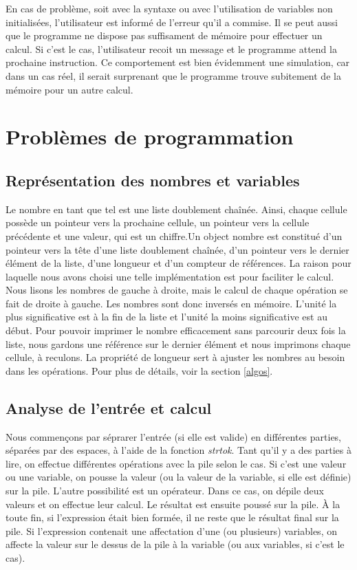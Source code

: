 \documentclass[letterpaper,12pt]{scrartcl}
\begin{document}
		En cas de problème, soit avec la syntaxe ou avec l'utilisation de variables non initialisées, l'utilisateur est informé de l'erreur qu'il a commise. Il se peut aussi que le programme ne dispose pas suffisament de mémoire pour effectuer un calcul. Si c'est le cas, l'utilisateur recoit un message et le programme attend la prochaine instruction. Ce comportement est bien évidemment une simulation, car dans un cas réel, il serait surprenant que le programme trouve subitement de la mémoire pour un autre calcul. 
			
	
    
	\section{Problèmes de programmation}
		\subsection{Représentation des nombres et variables}
		Le nombre en tant que tel est une liste doublement chaînée. Ainsi, chaque cellule possède un pointeur vers la prochaine cellule, un pointeur vers la cellule précédente et une valeur, qui est un chiffre.Un object nombre est constitué d'un pointeur vers la tête d'une liste doublement chaînée, d'un pointeur vers le dernier élément de la liste, d'une longueur et d'un compteur de références. La raison pour laquelle nous avons choisi une telle implémentation est pour faciliter le calcul. Nous lisons les nombres de gauche à droite, mais le calcul de chaque opération se fait de droite à gauche. Les nombres sont donc inversés en mémoire. L'unité la plus significative est à la fin de la liste et l'unité la moins significative est au début. Pour pouvoir imprimer le nombre efficacement sans parcourir deux fois la liste, nous gardons une référence sur le dernier élément et nous imprimons chaque cellule, à reculons. La propriété de longueur sert à ajuster les nombres au besoin dans les opérations. Pour plus de détails, voir la section \ref{algos}.

        
        \subsection{Analyse de l'entrée et calcul}
        Nous commençons par séprarer l'entrée (si elle est valide) en différentes parties, séparées par des espaces, à l'aide de la fonction \textit{strtok}. Tant qu'il y a des parties à lire, on effectue différentes opérations avec la pile selon le cas. Si c'est une valeur ou une variable, on pousse la valeur (ou la valeur de la variable, si elle est définie) sur la pile. L'autre possibilité est un opérateur. Dans ce cas, on dépile deux valeurs et on effectue leur calcul. Le résultat est ensuite poussé sur la pile. À la toute fin, si l'expression était bien formée, il ne reste que le résultat final sur la pile. Si l'expression contenait une affectation d'une (ou plusieurs) variables, on affecte la valeur sur le dessus de la pile à la variable (ou aux variables, si c'est le cas).
\end{document}
